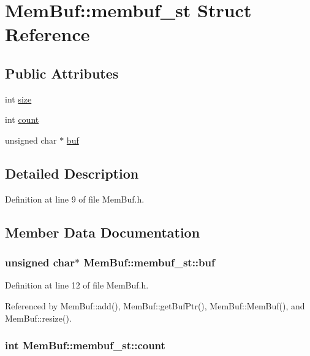 \hypertarget{structMemBuf_1_1membuf__st}{
\section{MemBuf::membuf\_\-st Struct Reference}
\label{structMemBuf_1_1membuf__st}
}
\subsection*{Public Attributes}
\begin{DoxyCompactItemize}
\item 
int \hyperlink{structMemBuf_1_1membuf__st_a5ee474be75ca5d65fce37f464d249535}{size}
\item 
int \hyperlink{structMemBuf_1_1membuf__st_a897938924fdb92f31dbaa9e494953248}{count}
\item 
unsigned char $\ast$ \hyperlink{structMemBuf_1_1membuf__st_acf4fd68d12e2d0b2ff8c4e526e6b9525}{buf}
\end{DoxyCompactItemize}


\subsection{Detailed Description}


Definition at line 9 of file MemBuf.h.

\subsection{Member Data Documentation}
\hypertarget{structMemBuf_1_1membuf__st_acf4fd68d12e2d0b2ff8c4e526e6b9525}{
\subsubsection[{buf}]{\setlength{\rightskip}{0pt plus 5cm}unsigned char$\ast$ {\bf MemBuf::membuf\_\-st::buf}}}
\label{structMemBuf_1_1membuf__st_acf4fd68d12e2d0b2ff8c4e526e6b9525}


Definition at line 12 of file MemBuf.h.

Referenced by MemBuf::add(), MemBuf::getBufPtr(), MemBuf::MemBuf(), and MemBuf::resize().\hypertarget{structMemBuf_1_1membuf__st_a897938924fdb92f31dbaa9e494953248}{
\subsubsection[{count}]{\setlength{\rightskip}{0pt plus 5cm}int {\bf MemBuf::membuf\_\-st::count}}}
\label{structMemBuf_1_1membuf__st_a897938924fdb92f31dbaa9e494953248}


